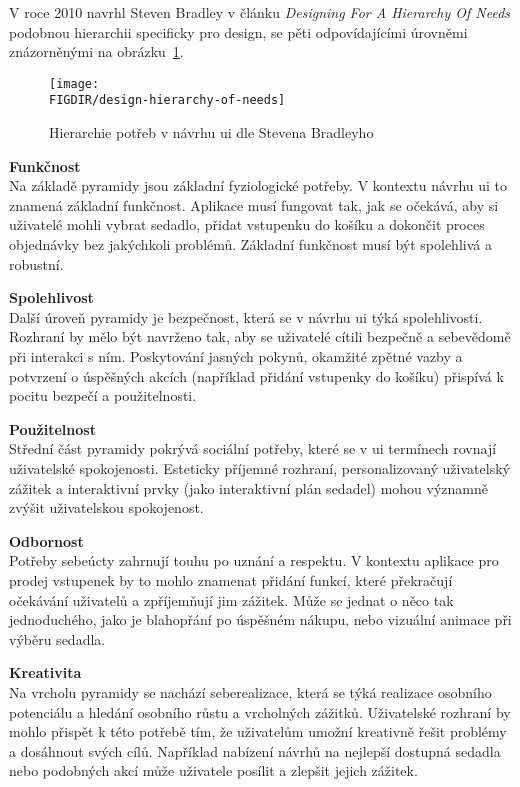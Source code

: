 V roce 2010 navrhl Steven Bradley v článku \textit{Designing For A Hierarchy Of Needs} podobnou hierarchii specificky pro design, se pěti odpovídajícími úrovněmi znázorněnými na obrázku~\ref{fig:design-hierarchy-of-needs}.\cite{bradley_hierarchy_of_needs}

\begin{figure}[H]
    \centering
    \texttt{[image: \\FIGDIR/design-hierarchy-of-needs]}
    \caption{Hierarchie potřeb v návrhu \ac{ui} dle Stevena Bradleyho\cite{bradley_hierarchy_of_needs}}
    \label{fig:design-hierarchy-of-needs}
\end{figure}

\textbf{Funkčnost}\\
Na základě pyramidy jsou základní fyziologické potřeby.
V kontextu návrhu \ac{ui} to znamená základní funkčnost.
Aplikace musí fungovat tak, jak se očekává, aby si uživatelé mohli vybrat sedadlo, přidat vstupenku do košíku a dokončit proces objednávky bez jakýchkoli problémů.
Základní funkčnost musí být spolehlivá a robustní.

\textbf{Spolehlivost}\\
Další úroveň pyramidy je bezpečnost, která se v návrhu \ac{ui} týká spolehlivosti.
Rozhraní by mělo být navrženo tak, aby se uživatelé cítili bezpečně a sebevědomě při interakci s ním.
Poskytování jasných pokynů, okamžité zpětné vazby a potvrzení o úspěšných akcích (například přidání vstupenky do košíku) přispívá k pocitu bezpečí a použitelnosti.

\textbf{Použitelnost}\\
Střední část pyramidy pokrývá sociální potřeby, které se v \ac{ui} termínech rovnají uživatelské spokojenosti.
Esteticky příjemné rozhraní, personalizovaný uživatelský zážitek a interaktivní prvky (jako interaktivní plán sedadel) mohou významně zvýšit uživatelskou spokojenost.

\textbf{Odbornost}\\
Potřeby sebeúcty zahrnují touhu po uznání a respektu.
V kontextu aplikace pro prodej vstupenek by to mohlo znamenat přidání funkcí, které překračují očekávání uživatelů a zpříjemňují jim zážitek.
Může se jednat o něco tak jednoduchého, jako je blahopřání po úspěšném nákupu, nebo vizuální animace při výběru sedadla.

\textbf{Kreativita}\\
Na vrcholu pyramidy se nachází seberealizace, která se týká realizace osobního potenciálu a hledání osobního růstu a vrcholných zážitků.
Uživatelské rozhraní by mohlo přispět k této potřebě tím, že uživatelům umožní kreativně řešit problémy a dosáhnout svých cílů.
Například nabízení návrhů na nejlepší dostupná sedadla nebo podobných akcí může uživatele posílit a zlepšit jejich zážitek.

